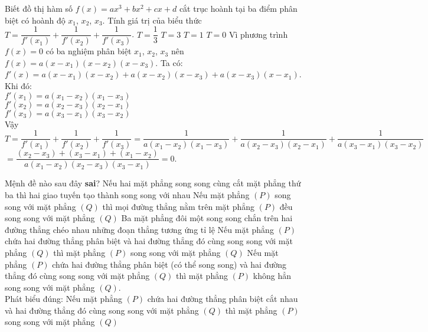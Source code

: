 \begin{ex}%
 Biết đồ thị hàm số $f(x) = ax^3 + bx^2 + cx + d$ cắt trục hoành tại ba điểm phân biệt có hoành độ $x_1$, $x_2$, $x_3$. Tính giá trị của biểu thức $T = \dfrac{1}{f'(x_1)} + \dfrac{1}{f'(x_2)} + \dfrac{1}{f'(x_3)}$.
 \choice
  {$T = \dfrac{1}{3}$}
  {$T = 3$}
  {$T = 1$}
  {\True $T = 0$}
 \loigiai
  {
  Vì phương trình $f(x) = 0$ có ba nghiệm phân biệt $x_1$, $x_2$, $x_3$ nên $f(x) = a(x - x_1)(x - x_2)(x - x_3)$.
  Ta có: $f'(x) = a(x - x_1)(x - x_2) + a(x - x_2)(x - x_3) + a(x - x_3)(x - x_1)$.\\
  Khi đó:\\
  $f'(x_1) = a(x_1 - x_2)(x_1 - x_3)$\\
  $f'(x_2) = a(x_2 - x_3)(x_2 - x_1)$\\
  $f'(x_3) = a(x_3 - x_1)(x_3 - x_2)$\\
  Vậy $T = \dfrac{1}{f'(x_1)} + \dfrac{1}{f'(x_2)} + \dfrac{1}{f'(x_3)} = \dfrac{1}{a(x_1 - x_2)(x_1 - x_3)} + \dfrac{1}{a(x_2 - x_3)(x_2 - x_1)} + \dfrac{1}{a(x_3 - x_1)(x_3 - x_2)}$\\
  $= \dfrac{(x_2 - x_3) + (x_3 - x_1) + (x_1 - x_2)}{a(x_1 - x_2)(x_2 - x_3)(x_3 - x_1)} = 0$.
  }
\end{ex}


\begin{ex}%
 Mệnh đề nào sau đây \textbf{sai}?
 \choice
  {Nếu hai mặt phẳng song song cùng cắt mặt phẳng thứ ba thì hai giao tuyến tạo thành song song với nhau}
  {Nếu mặt phẳng $(P)$ song song với mặt phẳng $(Q)$ thì mọi đường thẳng nằm trên mặt phẳng $(P)$ đều song song với mặt phẳng $(Q)$}
  {Ba mặt phẳng đôi một song song chắn trên hai đường thẳng chéo nhau những đoạn thẳng tương ứng tỉ lệ}
  {\True Nếu mặt phẳng $(P)$ chứa hai đường thẳng phân biệt và hai đường thẳng đó cùng song song với mặt phẳng $(Q)$ thì mặt phẳng $(P)$ song song với mặt phẳng $(Q)$}
 \loigiai
  {
  Nếu mặt phẳng $(P)$ chứa hai đường thẳng phân biệt (có thể song song) và hai đường thẳng đó cùng song song với mặt phẳng $(Q)$ thì mặt phẳng $(P)$ không hẳn song song với mặt phẳng $(Q)$.\\
  Phát biểu đúng: Nếu mặt phẳng $(P)$ chứa hai đường thẳng phân biệt cắt nhau và hai đường thẳng đó cùng song song với mặt phẳng $(Q)$ thì mặt phẳng $(P)$ song song với mặt phẳng $(Q)$
  }
\end{ex}


